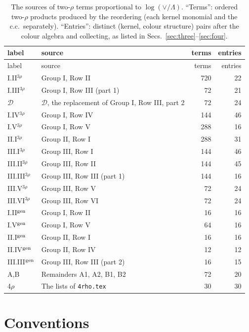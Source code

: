 \documentclass[10pt]{article}
\numberwithin{equation}{section}
\begin{document}
\begin{longtable}{@{}l >{\raggedright\arraybackslash}p{} r r@{}}
\caption{The sources of two-$\rho$ terms proportional to $\log(\vee/\Lambda)$. ``Terms'': ordered two-$\rho$ products produced by the reordering (each kernel monomial and the c.c.\ separately). ``Entries'': distinct (kernel, colour structure) pairs after the colour algebra and collecting, as listed in Secs.~\ref{sec:three}--\ref{sec:four}.}\label{tab:count}\\
label & source & terms & entries\\ \hline\endfirsthead
label & source & terms & entries\\ \hline\endhead
I.II$^{3\rho}$ & Group I, Row II & 720 & 22\\
I.III$^{3\rho}$ & Group I, Row III (part 1) & 72 & 21\\
$\mathcal D$ & $\mathcal D$, the replacement of Group I, Row III, part 2 & 72 & 24\\
I.IV$^{3\rho}$ & Group I, Row IV & 144 & 46\\
I.V$^{3\rho}$ & Group I, Row V & 288 & 16\\
II.I$^{3\rho}$ & Group II, Row I & 288 & 31\\
III.I$^{3\rho}$ & Group III, Row I & 144 & 46\\
III.II$^{3\rho}$ & Group III, Row II & 144 & 45\\
III.III$^{3\rho}$ & Group III, Row III (part 1) & 144 & 16\\
III.V$^{3\rho}$ & Group III, Row V & 72 & 24\\
III.VI$^{3\rho}$ & Group III, Row VI & 72 & 24\\
I.II$^{\rm gen}$ & Group I, Row II & 16 & 16\\
I.V$^{\rm gen}$ & Group I, Row V & 64 & 16\\
II.I$^{\rm gen}$ & Group II, Row I & 16 & 16\\
II.IV$^{\rm gen}$ & Group II, Row IV & 12 & 12\\
III.III$^{\rm gen}$ & Group III, Row III (part 2) & 16 & 15\\
A,B & Remainders A1, A2, B1, B2 & 72 & 20\\
4$\rho$ & The lists of \texttt{4rho.tex} & 30 & 30\\
\end{longtable}

\section{Conventions}\label{sec:conv}
\end{document}
